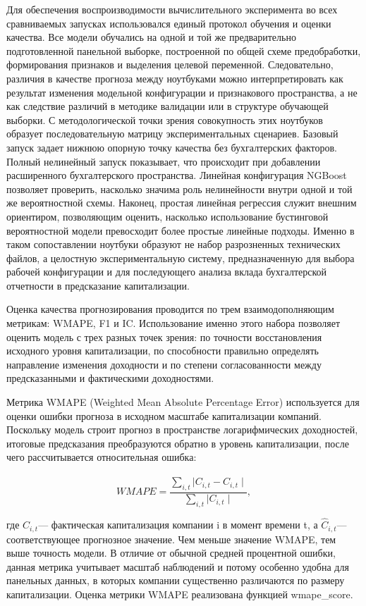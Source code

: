 \documentclass[
]{article}
\begin{document}
Для обеспечения воспроизводимости вычислительного эксперимента во всех сравниваемых запусках использовался единый протокол обучения и оценки качества. Все модели обучались на одной и той же предварительно подготовленной панельной выборке, построенной по общей схеме предобработки, формирования признаков и выделения целевой переменной. Следовательно, различия в качестве прогноза между ноутбуками можно интерпретировать как результат изменения модельной конфигурации и признакового пространства, а не как следствие различий в методике валидации или в структуре обучающей выборки. С методологической точки зрения совокупность этих ноутбуков образует последовательную матрицу экспериментальных сценариев. Базовый запуск задает нижнюю опорную точку качества без бухгалтерских факторов. Полный нелинейный запуск показывает, что происходит при добавлении расширенного бухгалтерского пространства. Линейная конфигурация NGBoost позволяет проверить, насколько значима роль нелинейности внутри одной и той же вероятностной схемы. Наконец, простая линейная регрессия служит внешним ориентиром, позволяющим оценить, насколько использование бустинговой вероятностной модели превосходит более простые линейные подходы. Именно в таком сопоставлении ноутбуки образуют не набор разрозненных технических файлов, а целостную экспериментальную систему, предназначенную для выбора рабочей конфигурации и для последующего анализа вклада бухгалтерской отчетности в предсказание капитализации.

Оценка качества прогнозирования проводится по трем взаимодополняющим метрикам: WMAPE, F1 и IC. Использование именно этого набора позволяет оценить модель с трех разных точек зрения: по точности восстановления исходного уровня капитализации, по способности правильно определять направление изменения доходности и по степени согласованности между предсказанными и фактическими доходностями.

Метрика WMAPE (Weighted Mean Absolute Percentage Error) используется для оценки ошибки прогноза в исходном масштабе капитализации компаний. Поскольку модель строит прогноз в пространстве логарифмических доходностей, итоговые предсказания преобразуются обратно в уровень капитализации, после чего рассчитывается относительная ошибка:

\[WMAPE = \frac{\sum_{i,t}^{}{\mid C_{i,t} - {\widehat{C}}_{i,t} \mid}}{\sum_{i,t}^{}{\mid C_{i,t} \mid}},\]

где \(C_{i,t}\)--- фактическая капитализация компании i в момент времени t, а \({\widehat{C}}_{i,t}\)--- соответствующее прогнозное значение. Чем меньше значение WMAPE, тем выше точность модели. В отличие от обычной средней процентной ошибки, данная метрика учитывает масштаб наблюдений и потому особенно удобна для панельных данных, в которых компании существенно различаются по размеру капитализации. Оценка метрики WMAPE реализована функцией wmape\_score.
\end{document}
